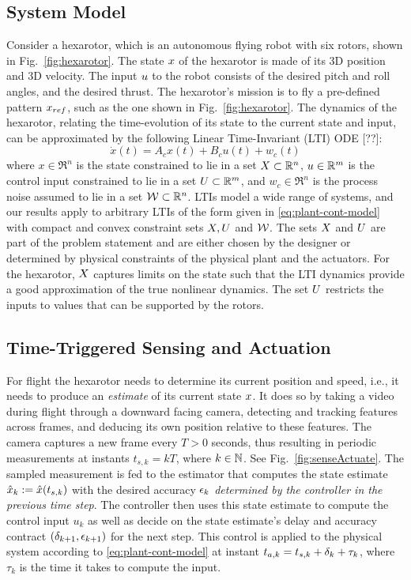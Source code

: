 \subsection{System Model}
\label{formulation}

Consider a hexarotor, which is an autonomous flying robot with six rotors, shown in Fig.~\ref{fig:hexarotor}.
The state $x$ of the hexarotor is made of its 3D position and 3D velocity.
The input $u$ to the robot consists of the desired pitch and roll angles, and the desired thrust.
The hexarotor's mission is to fly a pre-defined pattern $x_{ref}$, such as the one shown in Fig.~\ref{fig:hexarotor}.
The dynamics of the hexarotor, relating the time-evolution of its state to the current state and input, can be approximated by the following Linear Time-Invariant (LTI) ODE [??]:
\begin{equation}
\dot{x}(t) = A_{c}x(t)+B_{c}u(t)+w_{c}(t)  \label{eq:plant-cont-model}
\end{equation}
where $x\in \Re^{n}$ is the state constrained to lie in a set $X \subset \mathbb{R}^n$, 
$u\in\mathbb{R}^{m}$ is the control input constrained to lie in a set $U \subset \mathbb{R}^m$,
and $w_{c}\in\Re^{n}$ is the process noise assumed to lie in a set $\mathcal{W} \subset \mathbb{R}^n$. 
LTIs model a wide range of systems, and our results apply to arbitrary LTIs of the form given in \eqref{eq:plant-cont-model} with compact and convex constraint sets $X,U$ and $\mathcal{W}$.
The sets $X$ and $U$ are part of the problem statement and are either chosen by the designer or determined by physical constraints of the physical plant and the actuators.
For the hexarotor, $X$ captures limits on the state such that the LTI dynamics provide a good approximation of the true nonlinear dynamics. 
The set $U$ restricts the inputs to values that can be supported by the rotors.

\subsection{Time-Triggered Sensing and Actuation}
For flight the hexarotor needs to determine its current position and speed, i.e., it needs to produce an \emph{estimate} of its current state $x$.
It does so by taking a video during flight through a downward facing camera, detecting and tracking features across frames, and deducing its own position relative to these features.
The camera captures a new frame every $T > 0$ seconds, thus resulting in periodic measurements at instants $t_{s,k}=kT$,
where $k\in\mathbb{N}$.
See Fig.~\ref{fig:senseActuate}.
The sampled measurement is fed to the estimator that computes the state
estimate $\hat{x}_{k}:=\hat{x}(t_{s,k})$ with the desired
accuracy $\epsilon_k$ \emph{determined by the controller in the previous time step}. 
The controller then uses this state estimate
to compute the control input $u_{k}$ as well as decide on the
state estimate's delay and accuracy contract $(\delta_{k+1},\epsilon_{k+1})$ for the next step. 
This control is applied to the physical system according to \eqref{eq:plant-cont-model} at instant $t_{a,k} = t_{s,k}+\delta_k + \tau_k$, where $\tau_k$ is the time it takes to compute the input. 

